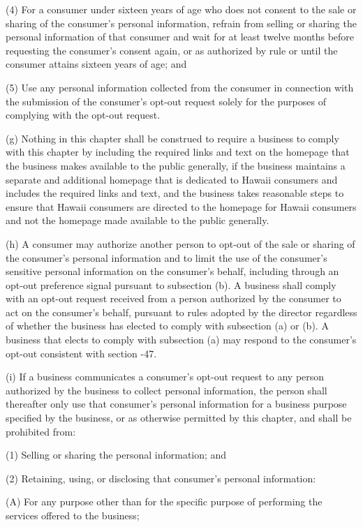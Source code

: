      (4)  For a consumer under sixteen years of age who does not consent to the sale or sharing of the consumer's personal information, refrain from selling or sharing the personal information of that consumer and wait for at least twelve months before requesting the consumer's consent again, or as authorized by rule or until the consumer attains sixteen years of age; and

     (5)  Use any personal information collected from the consumer in connection with the submission of the consumer's opt-out request solely for the purposes of complying with the opt-out request.

     (g)  Nothing in this chapter shall be construed to require a business to comply with this chapter by including the required links and text on the homepage that the business makes available to the public generally, if the business maintains a separate and additional homepage that is dedicated to Hawaii consumers and includes the required links and text, and the business takes reasonable steps to ensure that Hawaii consumers are directed to the homepage for Hawaii consumers and not the homepage made available to the public generally.

     (h)  A consumer may authorize another person to opt-out of the sale or sharing of the consumer's personal information and to limit the use of the consumer's sensitive personal information on the consumer's behalf, including through an opt-out preference signal pursuant to subsection (b).  A business shall comply with an opt-out request received from a person authorized by the consumer to act on the consumer's behalf, pursuant to rules adopted by the director regardless of whether the business has elected to comply with subsection (a) or (b).  A business that elects to comply with subsection (a) may respond to the consumer's opt-out consistent with section    -47.

     (i)  If a business communicates a consumer's opt-out request to any person authorized by the business to collect personal information, the person shall thereafter only use that consumer's personal information for a business purpose specified by the business, or as otherwise permitted by this chapter, and shall be prohibited from:

     (1)  Selling or sharing the personal information; and

     (2)  Retaining, using, or disclosing that consumer's personal information:

          (A)  For any purpose other than for the specific purpose of performing the services offered to the business;

